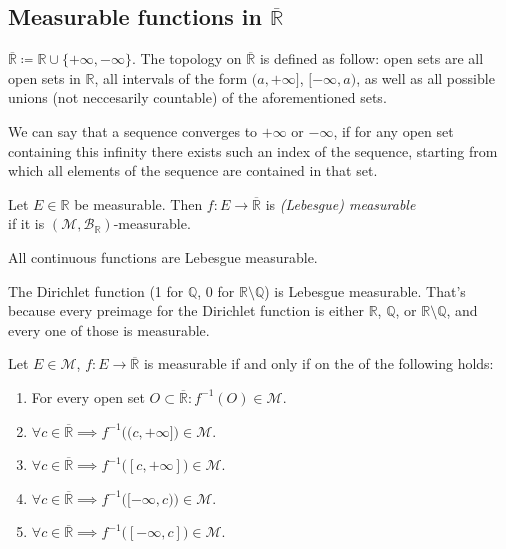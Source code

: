 \subsection{Measurable functions in $\overline{\mathbb{R}}$}
\begin{definition}
    $\overline{\mathbb{R}} \coloneqq \mathbb{R} \cup \{+\infty, -\infty\}$.
    The topology on $\overline{\mathbb{R}}$ is defined as follow:
    open sets are all open sets in $\mathbb{R}$, all intervals of the form
    $(a, +\infty]$, $[-\infty, a)$, as well as all possible unions (not neccesarily countable)
    of the aforementioned sets.
\end{definition}
\begin{definition}
    We can say that a sequence converges to $+\infty$ or $-\infty$, if for any open set
    containing this infinity there exists such an index of the sequence, 
    starting from which all elements of the sequence are contained in that set.
\end{definition}
\begin{definition}
    Let $E \in \mathbb{R}$ be measurable. Then $f : E \to \overline{\mathbb{R}}$
    is \textit{(Lebesgue) measurable}\\ if it is $(\mathcal{M}, \mathcal{B}_\mathbb{R})$-measurable.
\end{definition}
\begin{example}[1]
    All continuous functions are Lebesgue measurable.
\end{example}
\begin{example}[2]
    The Dirichlet function (1 for $\mathbb{Q}$, 0 for $\mathbb{R} \setminus \mathbb{Q}$)
    is Lebesgue measurable. 
    That's because every preimage for the Dirichlet function
    is either $\mathbb{R}$, $\mathbb{Q}$, or $\mathbb{R} \setminus \mathbb{Q}$, and
    every one of those is measurable.
\end{example}
\begin{corollary}
    Let $E \in \mathcal{M}$, $f : E \to \overline{\mathbb{R}}$ is measurable if and only
    if on the of the following holds:
    \begin{enumerate}
        \item {
            For every open set $O \subset \overline{\mathbb{R}}: f^{-1}(O) \in \mathcal{M}$.
        }
        \item {
            $\forall c \in \overline{\mathbb{R}} \implies
            f^{-1}\bigl((c, +\infty]\bigr) \in \mathcal{M}$.
        }
        \item {
            $\forall c \in \overline{\mathbb{R}} \implies
            f^{-1}\bigl([c, +\infty]\bigr) \in \mathcal{M}$.
        }
        \item {
            $\forall c \in \overline{\mathbb{R}} \implies
            f^{-1}\bigl([-\infty, c)\bigr) \in \mathcal{M}$.
        }
        \item {
            $\forall c \in \overline{\mathbb{R}} \implies
            f^{-1}\bigl([-\infty, c]\bigr) \in \mathcal{M}$.
        }
    \end{enumerate}
\end{corollary}